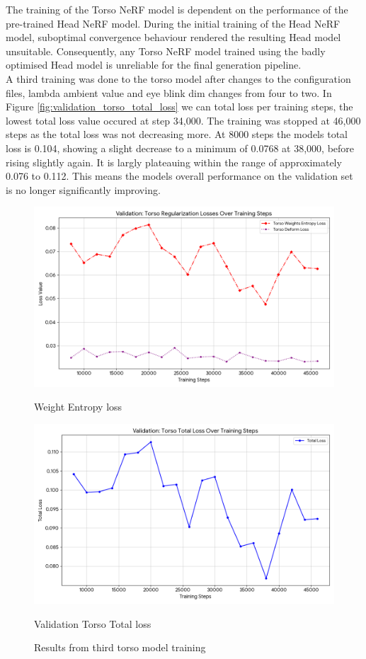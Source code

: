 \documentclass[12pt]{article}
\begin{document}
The training of the Torso NeRF model is dependent on the performance of the pre-trained Head NeRF model. During the initial training of the Head NeRF model, suboptimal convergence behaviour rendered the resulting Head model unsuitable. Consequently, any Torso NeRF model trained using the badly optimised Head model is unreliable for the final generation pipeline.\\
A third training was done to the torso model after changes to the configuration files, lambda ambient value and eye blink dim changes from four to two. In Figure \ref{fig:validation_torso_total_loss} we can total loss per training steps, the lowest total loss value occured at step 34,000. The training was stopped at 46,000 steps as the total loss was not decreasing more. At 8000 steps the models total loss is 0.104, showing a slight decrease to a minimum of 0.0768 at 38,000, before rising slightly again. It is largly plateauing within the range of approximately 0.076 to 0.112. This means the models overall performance on the validation set is no longer significantly improving. 
\begin{figure}[h!]
    \centering
    \begin{minipage}{0.45\textwidth}
        \centering
        \includegraphics[width=0.8\linewidth]{images/torso_weight_entropy_loss.png}
        \caption{Weight Entropy loss}
        \label{fig:torso_weight_entropy_loss}
    \end{minipage}\hfill
    \begin{minipage}{0.45\textwidth}
        \centering
        \includegraphics[width=0.8\linewidth]{images/validation_torso_total_loss.png}
        \caption{Validation Torso Total loss}
        \label{fig:validation_torso_total_loss}
    \end{minipage}
    \caption{Results from third torso model training}
    \label{fig:third-training}
\end{figure}
\end{document}
